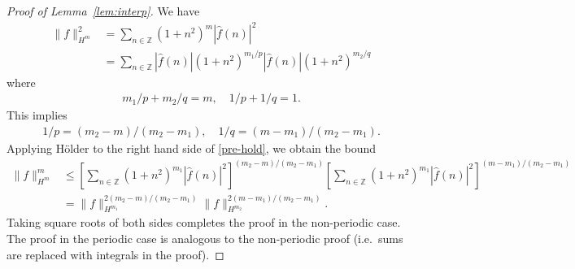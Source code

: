 \documentclass[12pt,reqno]{amsart}
\numberwithin{equation}{section}  %
\numberwithin{figure}{section}
\newcommand{\rr}{\mathbb{R}}
\newcommand{\zz}{\mathbb{Z}}
\newcommand{\wh}{\widehat}
\newcommand{\p}{\partial}
\begin{document}
%
%
\begin{proof}[Proof of Lemma~\ref{lem:interp}]
 We have
 \begin{equation}
   \label{pre-hold}
 \begin{split}
   \| f \|_{H^{m}}^{2}
   & = \sum_{n \in \zz} (1 + n^{2})^{m} | \wh{f}(n) |^{2} 
   \\
   & = \sum_{n \in \zz} | \wh{f}(n) | (1 + n^{2})^{m_{1}/p} | \wh{f}(n) |
   (1 + n^{2})^{m_{2}/q} 
 \end{split}
 \end{equation}
 where
 \begin{equation*}
 \begin{split}
   m_{1}/p + m_{2}/q =m, \quad 1/p + 1/q =1.
 \end{split}
 \end{equation*}
This implies 
 \begin{equation*}
 \begin{split}
   1/p = (m_{2} -m)/(m_{2} -m_{1}), \quad 1/q = (m -m_{1})/(m_{2} -m_{1}). 
 \end{split}
 \end{equation*}
 Applying H\"older to the right hand side of \eqref{pre-hold}, we obtain the
 bound
 \begin{equation*}
 \begin{split}
   \| f \|_{H^{m}}^{m}
   & \le  \left[ \sum_{n \in \zz} (1 + n^{2})^{m_{1}} | \wh{f}(n) |^{2} 
   \right]^{(m_{2} - m)/(m_{2} -m_{1})} \left[ \sum_{n \in \zz} (1 + n^{2})^{m_{1}}
   | \wh{f}(n) |^{2}  \right]^{(m - m_{1})/(m_{2} -m_{1})}
   \\
   & = \| f \|_{H^{m_{1}}}^{2 (m_{2} - m)/(m_{2} -m_{1})}
   \| f \|_{H^{m_{2}}}^{2 (m - m_{1})/(m_{2} -m_{1})}.
 \end{split}
 \end{equation*}
 Taking square roots of both sides completes the proof in the non-periodic case.
 The proof in the periodic case is analogous to the non-periodic proof (i.e.\
 sums are replaced with integrals in the proof).
  \end{proof}
\end{document}
